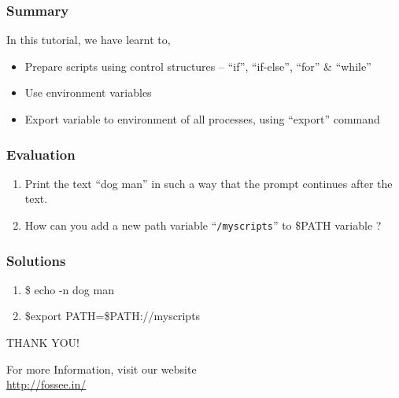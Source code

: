 \documentclass[17pt,compress]{beamer}
\begin{document}
\begin{frame}
\frametitle{Summary}
\label{sec-8}

  In this tutorial, we have learnt to,


\begin{itemize}
\item Prepare scripts using control structures -- ``if'', ``if-else'',
      ``for'' \& ``while''
\item Use environment variables
\item Export variable to environment of all processes, using 
      ``export'' command
\end{itemize}
\end{frame}
\begin{frame}[fragile]
\frametitle{Evaluation}
\label{sec-9}


\begin{enumerate}
\item Print the text ``dog man'' in such a way that the prompt continues after 
the text.
\vspace{8pt}
\item How can you add a new path variable ``\texttt{/myscripts}'' to \$PATH variable ?
\end{enumerate}
\end{frame}
\begin{frame}
\frametitle{Solutions}
\label{sec-10}


\begin{enumerate}
\item \$ echo -n dog man
\vspace{15pt}
\item \$export PATH=\$PATH://myscripts
\end{enumerate}
\end{frame}
\begin{frame}

  \begin{block}{}
  \begin{center}
  {\Large THANK YOU!} 
  \end{center}
  \end{block}
\begin{block}{}
  \begin{center}
    For more Information, visit our website\\
    {\color{blue}\url{http://fossee.in/}}
  \end{center}  
  \end{block}
\end{frame}
\end{document}

